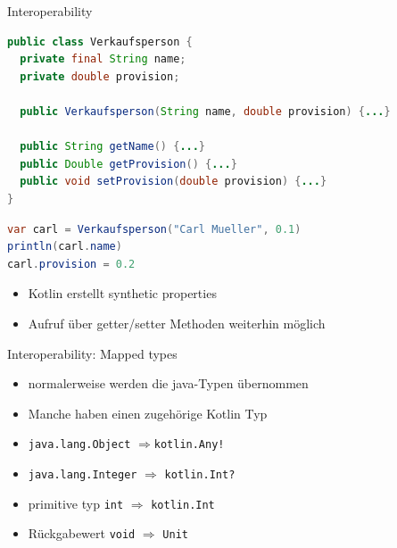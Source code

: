\documentclass{beamer}
\begin{document}
\begin{frame}[fragile]{Interoperability}
  \begin{lstlisting}[language=Java]
public class Verkaufsperson {
  private final String name;
  private double provision;

  public Verkaufsperson(String name, double provision) {...}

  public String getName() {...}
  public Double getProvision() {...}
  public void setProvision(double provision) {...}
}
  \end{lstlisting}
  \pause
  \begin{lstlisting}[language=Java]
var carl = Verkaufsperson("Carl Mueller", 0.1)
println(carl.name)
carl.provision = 0.2
  \end{lstlisting}
  \pause
  \begin{itemize}
    \item Kotlin erstellt synthetic properties
    \item Aufruf über getter/setter Methoden weiterhin möglich
  \end{itemize}
\end{frame}

\begin{frame}[fragile]{Interoperability: Mapped types}
  \begin{itemize}[<+->]
    \item normalerweise werden die java-Typen übernommen
    \item Manche haben einen zugehörige Kotlin Typ
  \end{itemize}
  \pause \vspace{0.2cm}
  \begin{itemize}[<+->]
    \item \texttt{java.lang.Object} $\Rightarrow $\texttt{kotlin.Any!}
    \item \texttt{java.lang.Integer} $\Rightarrow$ \texttt{kotlin.Int?}
    \item primitive typ \texttt{int} $\Rightarrow$ \texttt{kotlin.Int}
    \item Rückgabewert \texttt{void} $\Rightarrow$ \texttt{Unit}
  \end{itemize}
\end{frame}
\end{document}
